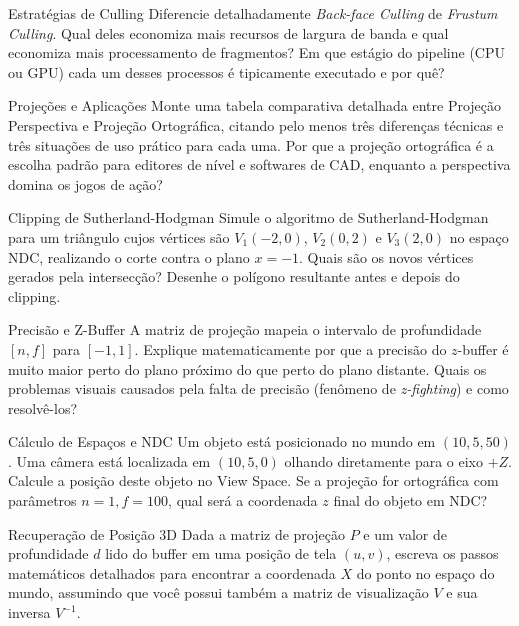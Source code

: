 \begin{exercicio}{Estratégias de Culling}
    Diferencie detalhadamente \textit{Back-face Culling} de \textit{Frustum Culling}. Qual deles economiza mais recursos de largura de banda e qual economiza mais processamento de fragmentos? Em que estágio do pipeline (CPU ou GPU) cada um desses processos é tipicamente executado e por quê?
\end{exercicio}

\begin{exercicio}{Projeções e Aplicações}
    Monte uma tabela comparativa detalhada entre Projeção Perspectiva e Projeção Ortográfica, citando pelo menos três diferenças técnicas e três situações de uso prático para cada uma. Por que a projeção ortográfica é a escolha padrão para editores de nível e softwares de CAD, enquanto a perspectiva domina os jogos de ação?
\end{exercicio}

\begin{exercicio}{Clipping de Sutherland-Hodgman}
    Simule o algoritmo de Sutherland-Hodgman para um triângulo cujos vértices são $V_1(-2, 0)$, $V_2(0, 2)$ e $V_3(2, 0)$ no espaço NDC, realizando o corte contra o plano $x = -1$. Quais são os novos vértices gerados pela intersecção? Desenhe o polígono resultante antes e depois do clipping.
\end{exercicio}

\begin{exercicio}{Precisão e Z-Buffer}
    A matriz de projeção mapeia o intervalo de profundidade $[n, f]$ para $[-1, 1]$. Explique matematicamente por que a precisão do $z$-buffer é muito maior perto do plano próximo do que perto do plano distante. Quais os problemas visuais causados pela falta de precisão (fenômeno de \textit{z-fighting}) e como resolvê-los?
\end{exercicio}

\begin{exercicio}{Cálculo de Espaços e NDC}
    Um objeto está posicionado no mundo em $(10, 5, 50)$. Uma câmera está localizada em $(10, 5, 0)$ olhando diretamente para o eixo $+Z$. Calcule a posição deste objeto no View Space. Se a projeção for ortográfica com parâmetros $n=1, f=100$, qual será a coordenada $z$ final do objeto em NDC?
\end{exercicio}

\begin{exercicio}{Recuperação de Posição 3D}
    Dada a matriz de projeção $P$ e um valor de profundidade $d$ lido do buffer em uma posição de tela $(u, v)$, escreva os passos matemáticos detalhados para encontrar a coordenada $X$ do ponto no espaço do mundo, assumindo que você possui também a matriz de visualização $V$ e sua inversa $V^{-1}$.
\end{exercicio}

